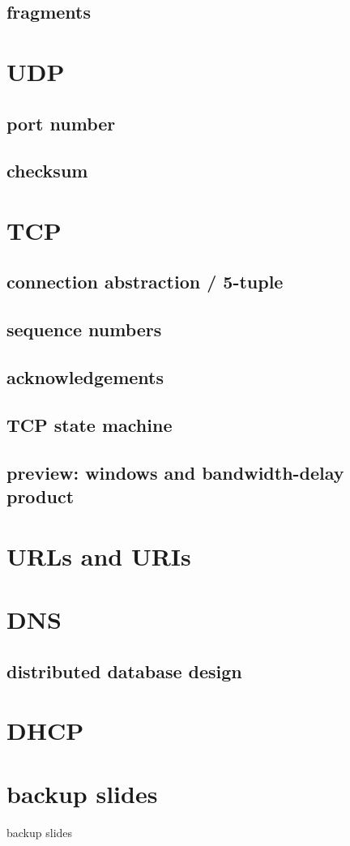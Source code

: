 \subsection{fragments}

\section{UDP}

\subsection{port number}

\subsection{checksum}

\section{TCP}

\subsection{connection abstraction / 5-tuple}

\subsection{sequence numbers}

\subsection{acknowledgements}

\subsection{TCP state machine}

\subsection{preview: windows and bandwidth-delay product}

\section{URLs and URIs}

\section{DNS}

\subsection{distributed database design}

\section{DHCP}



\section{backup slides}
\begin{frame}{backup slides}
\end{frame}



